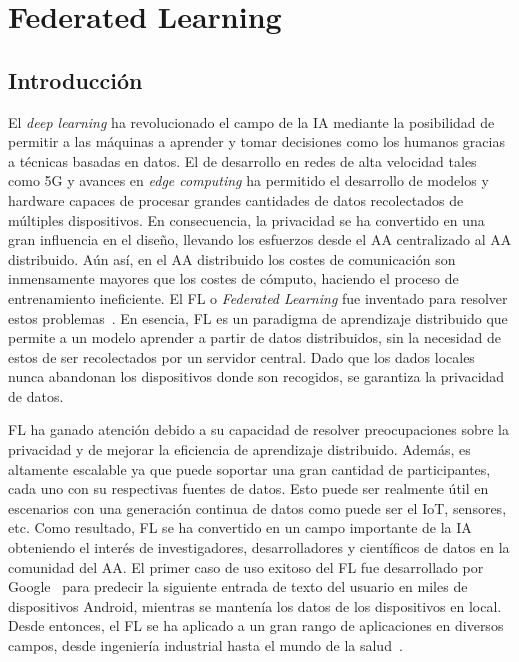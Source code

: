 \chapter{Federated Learning}\label{sec:fl}
\section{Introducción}
El \textit{deep learning} ha revolucionado el campo de la \ac{IA} mediante la posibilidad de permitir a las máquinas a aprender y tomar decisiones como los humanos gracias a técnicas basadas en datos. El de desarrollo en redes de alta velocidad tales como 5G y avances en \textit{edge computing} ha permitido el desarrollo de modelos y hardware capaces de procesar grandes cantidades de datos recolectados de múltiples dispositivos. En consecuencia, la privacidad se ha convertido en una gran influencia en el diseño, llevando los esfuerzos desde el \ac{AA} centralizado al \ac{AA} distribuido. Aún así, en el \ac{AA} distribuido los costes de comunicación son inmensamente mayores que los costes de cómputo, haciendo el proceso de entrenamiento ineficiente. El \ac{FL} o \textit{Federated Learning} fue inventado para resolver estos problemas~\cite{tutorial-nuria}. En esencia, \ac{FL} es un paradigma de aprendizaje distribuido que permite a un modelo aprender a partir de datos distribuidos, sin la necesidad de estos de ser recolectados por un servidor central. Dado que los dados locales nunca abandonan los dispositivos donde son recogidos, se garantiza la privacidad de datos.

\ac{FL} ha ganado atención debido a su capacidad de resolver preocupaciones sobre la privacidad y de mejorar la eficiencia de aprendizaje distribuido. Además, es altamente escalable ya que puede soportar una gran cantidad de participantes, cada uno con su respectivas fuentes de datos. Esto puede ser realmente útil en escenarios con una generación continua de datos como puede ser el \ac{IoT}, sensores, etc. Como resultado, \ac{FL} se ha convertido en un campo importante de la \ac{IA} obteniendo el interés de investigadores, desarrolladores y científicos de datos en la comunidad del \ac{AA}. El primer caso de uso exitoso del \ac{FL} fue desarrollado por Google~\cite{mcmahan-2018} para predecir la siguiente entrada de texto del usuario en miles de dispositivos Android, mientras se mantenía los datos de los dispositivos en local. Desde entonces, el \ac{FL} se ha aplicado a un gran rango de aplicaciones en diversos campos, desde ingeniería industrial hasta el mundo de la salud~\cite{survey-nuria-2023}. 

